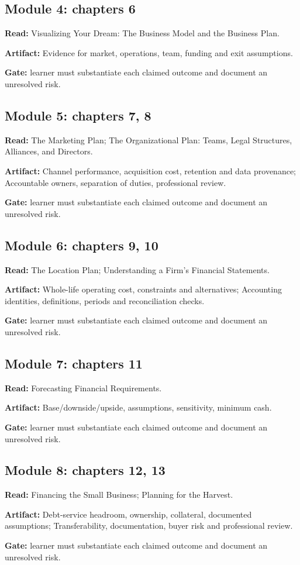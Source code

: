 \documentclass[11pt]{article}
\begin{document}
\subsection*{Module 4: chapters 6}
\textbf{Read:} Visualizing Your Dream: The Business Model and the Business Plan.\par
\textbf{Artifact:} Evidence for market, operations, team, funding and exit assumptions.\par
\textbf{Gate:} learner must substantiate each claimed outcome and document an unresolved risk.\par
\subsection*{Module 5: chapters 7, 8}
\textbf{Read:} The Marketing Plan; The Organizational Plan: Teams, Legal Structures, Alliances, and Directors.\par
\textbf{Artifact:} Channel performance, acquisition cost, retention and data provenance; Accountable owners, separation of duties, professional review.\par
\textbf{Gate:} learner must substantiate each claimed outcome and document an unresolved risk.\par
\subsection*{Module 6: chapters 9, 10}
\textbf{Read:} The Location Plan; Understanding a Firm’s Financial Statements.\par
\textbf{Artifact:} Whole-life operating cost, constraints and alternatives; Accounting identities, definitions, periods and reconciliation checks.\par
\textbf{Gate:} learner must substantiate each claimed outcome and document an unresolved risk.\par
\subsection*{Module 7: chapters 11}
\textbf{Read:} Forecasting Financial Requirements.\par
\textbf{Artifact:} Base/downside/upside, assumptions, sensitivity, minimum cash.\par
\textbf{Gate:} learner must substantiate each claimed outcome and document an unresolved risk.\par
\subsection*{Module 8: chapters 12, 13}
\textbf{Read:} Financing the Small Business; Planning for the Harvest.\par
\textbf{Artifact:} Debt-service headroom, ownership, collateral, documented assumptions; Transferability, documentation, buyer risk and professional review.\par
\textbf{Gate:} learner must substantiate each claimed outcome and document an unresolved risk.\par
\end{document}
